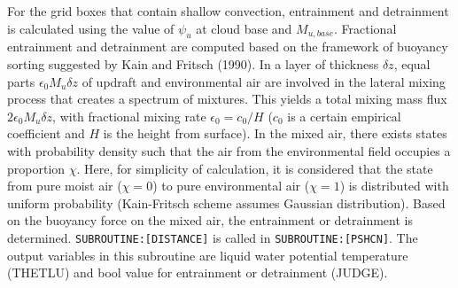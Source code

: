 For the grid boxes that contain shallow convection, entrainment and detrainment is calculated using the value of \(\psi_u\) at cloud base and \(M_{u,base}\). Fractional entrainment and detrainment are
computed based on the framework of buoyancy sorting suggested by Kain and Fritsch (1990). In a layer of thickness \(\delta z\), equal parts \(\epsilon_0 M_u \delta z\) of updraft and environmental air
are involved in the lateral mixing process that creates a spectrum of mixtures. This yields a total mixing mass flux \(2\epsilon_0 M_u \delta z\), with fractional mixing rate \(\epsilon_0=c_0/H\)
(\(c_0\) is a certain empirical coefficient and \(H\) is the height from surface). In the mixed air, there exists states with probability density such that the air from the environmental field
occupies a proportion \(\chi\). Here, for simplicity of calculation, it is considered that the state from pure moist air (\(\chi=0\)) to pure environmental air (\(\chi=1\)) is distributed with uniform
probability (Kain-Fritsch scheme assumes Gaussian distribution). Based on the buoyancy force on the mixed air, the entrainment or detrainment is determined. \texttt{SUBROUTINE:{[}DISTANCE{]}} is
called in \texttt{SUBROUTINE:{[}PSHCN{]}}. The output variables in this subroutine are liquid water potential temperature (THETLU) and bool value for entrainment or detrainment (JUDGE).

